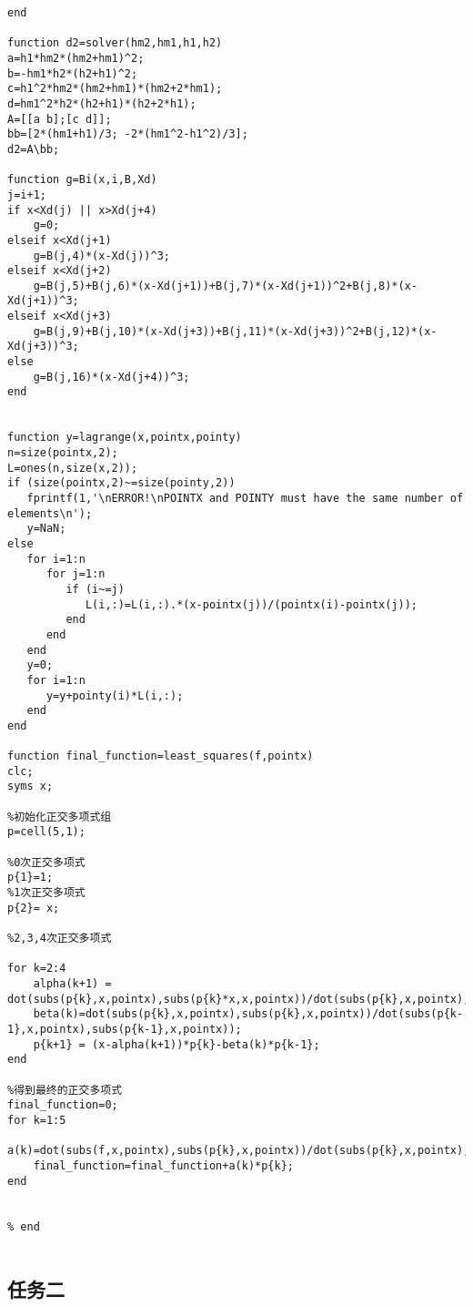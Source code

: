 \documentclass{ctexart}%
\begin{document}
\begin{lstlisting}
end

function d2=solver(hm2,hm1,h1,h2)
a=h1*hm2*(hm2+hm1)^2;
b=-hm1*h2*(h2+h1)^2;
c=h1^2*hm2*(hm2+hm1)*(hm2+2*hm1);
d=hm1^2*h2*(h2+h1)*(h2+2*h1);
A=[[a b];[c d]];
bb=[2*(hm1+h1)/3; -2*(hm1^2-h1^2)/3];
d2=A\bb;

function g=Bi(x,i,B,Xd)
j=i+1;
if x<Xd(j) || x>Xd(j+4)
    g=0;
elseif x<Xd(j+1)
    g=B(j,4)*(x-Xd(j))^3;
elseif x<Xd(j+2)
    g=B(j,5)+B(j,6)*(x-Xd(j+1))+B(j,7)*(x-Xd(j+1))^2+B(j,8)*(x-Xd(j+1))^3;
elseif x<Xd(j+3)
    g=B(j,9)+B(j,10)*(x-Xd(j+3))+B(j,11)*(x-Xd(j+3))^2+B(j,12)*(x-Xd(j+3))^3;
else
    g=B(j,16)*(x-Xd(j+4))^3;
end


function y=lagrange(x,pointx,pointy)
n=size(pointx,2);
L=ones(n,size(x,2));
if (size(pointx,2)~=size(pointy,2))
   fprintf(1,'\nERROR!\nPOINTX and POINTY must have the same number of elements\n');
   y=NaN;
else
   for i=1:n
      for j=1:n
         if (i~=j)
            L(i,:)=L(i,:).*(x-pointx(j))/(pointx(i)-pointx(j));
         end
      end
   end
   y=0;
   for i=1:n
      y=y+pointy(i)*L(i,:);
   end
end

function final_function=least_squares(f,pointx)
clc;
syms x;

%初始化正交多项式组
p=cell(5,1);

%0次正交多项式
p{1}=1;
%1次正交多项式
p{2}= x;

%2,3,4次正交多项式

for k=2:4
    alpha(k+1) = dot(subs(p{k},x,pointx),subs(p{k}*x,x,pointx))/dot(subs(p{k},x,pointx),subs(p{k},x,pointx));
    beta(k)=dot(subs(p{k},x,pointx),subs(p{k},x,pointx))/dot(subs(p{k-1},x,pointx),subs(p{k-1},x,pointx));
    p{k+1} = (x-alpha(k+1))*p{k}-beta(k)*p{k-1};
end

%得到最终的正交多项式
final_function=0;
for k=1:5
    a(k)=dot(subs(f,x,pointx),subs(p{k},x,pointx))/dot(subs(p{k},x,pointx),subs(p{k},x,pointx));
    final_function=final_function+a(k)*p{k};
end


% end


\end{lstlisting}
\subsection{任务二}
\end{document}
